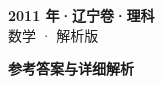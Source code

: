 \documentclass[zihao=-4, a4paper]{ctexart}
\begin{document}
\begin{center}
  {\Large\bfseries 2011 年·辽宁卷·理科}\\[4pt]
  {\large 数学 · 解析版}
\end{center}
\medskip
{}

\clearpage
{}
\begin{center}{\Large\bfseries 参考答案与详细解析}\end{center}
\medskip

\end{document}
